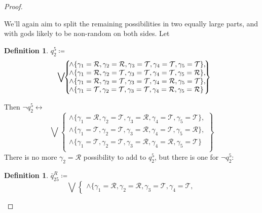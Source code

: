 \documentclass[twoside,twocolumn,a4paper,11pt]{article}
\theoremstyle{definition}
\newtheorem{defn}[theorem]{Definition}
\begin{document}
\begin{proof}
\begin{description}[itemsep=2pt,topsep=3pt,leftmargin=0.6em]
We'll again aim to split the remaining possibilities in two equally large parts, 
and with gods likely to be non-random on both sides.
Let
\begin{defn}%
\label{def:q25}
$q_{2}^5 \coloneqq$
\begin{equation}
\label{eq:q25}
\bigvee\!\!
 \left\lbrace\!
  \begin{matrix}
   \land\{\gamma_1=\mathcal{R},\gamma_2=\mathcal{R},\gamma_3=\mathcal{T},\gamma_4=\mathcal{T},
   \gamma_5=\mathcal{T}\},\\
   \land\{\gamma_1=\mathcal{R},\gamma_2=\mathcal{T},\gamma_3=\mathcal{T},\gamma_4=\mathcal{T},
   \gamma_5=\mathcal{R}\},\\
   \land\{\gamma_1=\mathcal{R},\gamma_2=\mathcal{T},\gamma_3=\mathcal{T},\gamma_4=\mathcal{R},
   \gamma_5=\mathcal{T}\},\\
   \land\{\gamma_1=\mathcal{T},\gamma_2=\mathcal{T},\gamma_3=\mathcal{T},\gamma_4=\mathcal{R},
   \gamma_5=\mathcal{R}\}\;\vspace{0pt}\\
  \end{matrix}\!
 \right\rbrace\!\!\!\!
\end{equation}
\end{defn}
Then $\neg q_{2}^5 \leftrightarrow$
\begin{equation}
\label{eq:notq25}
\bigvee\!\!
 \left\lbrace\!
  \begin{matrix}
   \land\{\gamma_1=\mathcal{R},\gamma_2=\mathcal{T},\gamma_3=\mathcal{R},\gamma_4=\mathcal{T},
   \gamma_5=\mathcal{T}\},\\
   \land\{\gamma_1=\mathcal{T},\gamma_2=\mathcal{T},\gamma_3=\mathcal{R},\gamma_4=\mathcal{T},
   \gamma_5=\mathcal{R}\},\\
   \land\{\gamma_1=\mathcal{T},\gamma_2=\mathcal{T},\gamma_3=\mathcal{R},\gamma_4=\mathcal{R},
   \gamma_5=\mathcal{T}\}\;\\
  \end{matrix}\!
 \right\rbrace\!\!\!\!\!
\end{equation}
There is no more $\gamma_2=\mathcal{R}$ possibility to add to $q_2^5$,
but there is one for $\neg q_2^5$:
\begin{defn}%
\label{def:notq25R}
$\bar{q}_{25}^R \coloneqq$
\begin{equation}
\label{eq:notq25R}
\bigvee\!\!
 \left\lbrace\!
  \begin{matrix}
   \land\{\gamma_1=\mathcal{R},\gamma_2=\mathcal{R},\gamma_3=\mathcal{T},\gamma_4=\mathcal{T},

\end{matrix}
\end{equation}
\end{defn}
\end{description}
\end{proof}
\end{document}
